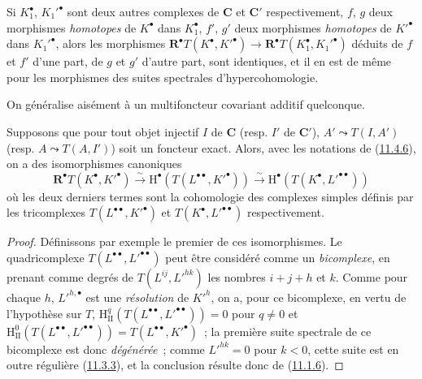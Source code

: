 \begin{env}[11.4.6]
Si $K_1^\bullet$, $K_1'^\bullet$ sont deux autres complexes de $\boldsymbol{C}$ et
$\boldsymbol{C}'$ respectivement, $f$, $g$ deux morphismes \emph{homotopes} de
$K^\bullet$ dans $K_1^\bullet$, $f'$, $g'$ deux morphismes \emph{homotopes} de
$K'^\bullet$ dans $K_1'^\bullet$, alors les morphismes
$\mathbf R^\bullet T(K^\bullet,K'^\bullet)\to
\mathbf R^\bullet T(K_1^\bullet,K_1'^\bullet)$ déduits de $f$ et $f'$ d'une
part, de $g$ et $g'$ d'autre part, sont identiques, et il en est de même pour
les morphismes des suites spectrales d'hypercohomologie.

On généralise aisément à un multifoncteur covariant additif quelconque.
\end{env}

\begin{proposition}[11.4.7]
\label{0.11.4.7-fr}
Supposons que pour tout objet injectif $I$ de $\boldsymbol{C}$ \textup{(resp.} $I'$ de
$\boldsymbol{C}'$), $A'\leadsto T(I,A')$ \textup{(resp.} $A\leadsto T(A,I')$) soit un
foncteur exact. Alors, avec les notations de
\textup{(\hyperref[0.11.4.6-fr]{11.4.6})}, on a des isomorphismes canoniques
\[
  \label{0.11.4.7.1-fr}
  \mathbf R^\bullet T(K^\bullet,K'^\bullet)
  \xrightarrow{\sim}\mathrm H^\bullet(T(L^{\bullet\bullet},K'^\bullet))
  \xrightarrow{\sim}\mathrm H^\bullet(T(K^\bullet,L'^{\bullet\bullet}))
  \tag{11.4.7.1}
\]
où les deux derniers termes sont la cohomologie des complexes simples définis
par les tricomplexes $T(L^{\bullet\bullet},K'^\bullet)$ et
$T(K^\bullet,L'^{\bullet\bullet})$ respectivement.
\end{proposition}

\begin{proof}
Définissons par exemple le premier de ces isomorphismes. Le quadricomplexe
$T(L^{\bullet\bullet},L'^{\bullet\bullet})$ peut être considéré comme un
\emph{bicomplexe}, en prenant comme degrés de $T(L^{ij},L'^{hk})$ les nombres
$i+j+h$ et $k$. Comme pour chaque $h$, $L'^{h,\bullet}$ est une
\emph{résolution} de $K'^h$, on a, pour ce bicomplexe, en vertu de l'hypothèse
sur $T$,
$\mathrm H_{\mathrm{II}}^q(T(L^{\bullet\bullet},L'^{\bullet\bullet}))=0$
pour $q\neq0$ et
$\mathrm H_{\mathrm{II}}^0(T(L^{\bullet\bullet},L'^{\bullet\bullet}))
=T(L^{\bullet\bullet},K'^\bullet)$~; la première suite spectrale de ce
bicomplexe est donc \emph{dégénérée}~; comme $L'^{hk}=0$ pour $k<0$, cette
suite est en outre régulière (\hyperref[0.11.3.3-fr]{11.3.3}), et la
conclusion résulte donc de (\hyperref[0.11.1.6-fr]{11.1.6}).
\end{proof}


